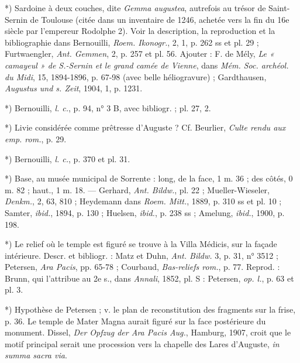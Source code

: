 \documentclass[a4paper, 11pt, oneside, polutonikogreek, french]{article}
\begin{document}
*) Sardoine à deux couches, dite \emph{Gemma augustea}, autrefois au trésor de Saint-Sernin de Toulouse (citée dans un inventaire de 1246, achetée vers la fin du 16e siècle par l'empereur Rodolphe 2). Voir la description, la reproduction et la bibliographie dans Bernouilli, \emph{Roem. Ikonogr.}, 2, 1, p. 262 ss et pl. 29 ; Furtwaengler, \emph{Ant. Gemmen}, 2, p. 257 et pl. 56. Ajouter : F. de Mély, \emph{Le « camayeul » de S.-Sernin et le grand camée de Vienne}, dans \emph{Mém. Soc. archéol. du Midi}, 15, 1894-1896, p. 67-98 (avec belle héliogravure) ; Gardthausen, \emph{Augustus und s. Zeit}, 1904, 1, p. 1231.

*) Bernouilli, \emph{l. c.}, p. 94, n° 3 B, avec bibliogr. ; pl. 27, 2.

*) Livie considérée comme prêtresse d'Auguste ? Cf. Beurlier, \emph{Culte rendu aux emp. rom.}, p. 29.

*) Bernouilli, \emph{l. c.}, p. 370 et pl. 31.

*) Base, au musée municipal de Sorrente : long, de la face, 1 m. 36 ; des côtés, 0 m. 82 ; haut., 1 m. 18. --- Gerhard, \emph{Ant. Bildw.}, pl. 22 ; Mueller-Wieseler, \emph{Denkm.}, 2, 63, 810 ; Heydemann dans \emph{Roem. Mitt.}, 1889, p. 310 ss et pl. 10 ; Samter, \emph{ibid.}, 1894, p. 130 ; Huelsen, \emph{ibid.}, p. 238 ss ; Amelung, \emph{ibid.}, 1900, p. 198.

*) Le relief où le temple est figuré se trouve à la Villa Médicis, sur la façade intérieure. Descr. et bibliogr. : Matz et Duhn, \emph{Ant. Bildw.} 3, p. 31, n° 3512 ; Petersen, \emph{Ara Pacis}, pp. 65-78 ; Courbaud, \emph{Bas-reliefs rom.}, p. 77. Reprod. : Brunn, qui l'attribue au 2e s., dans \emph{Annali}, 1852, pl. S : Petersen, \emph{op. l.}, p. 63 et pl. 3.

*) Hypothèse de Petersen ; v. le plan de reconstitution des fragments sur la frise, p. 36. Le temple de Mater Magna aurait figuré sur la face postérieure du monument. Dissel, \emph{Der Opfzug der Ara Pacis Aug.}, Hamburg, 1907, croit que le motif principal serait une procession vers la chapelle des Lares d'Auguste, \emph{in summa sacra via}.
\end{document}
